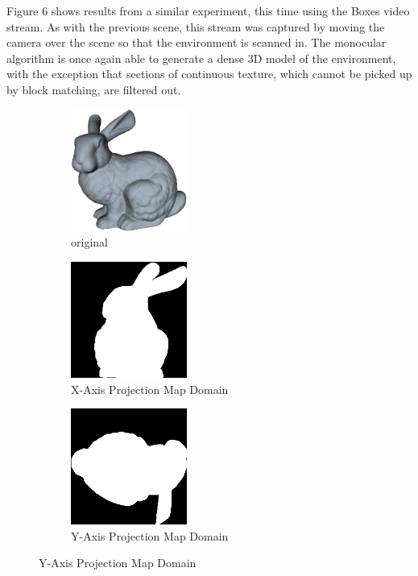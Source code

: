 Figure 6 shows results from a similar experiment, this
time using the Boxes video stream. As with the previous
scene, this stream was captured by moving the camera over the scene so that the environment is scanned in. The
monocular algorithm is once again able to generate a dense
3D model of the environment, with the exception that
sections of continuous texture, which cannot be picked up by
block matching, are filtered out.



\begin{figure}[!htb]
        \centering
        \begin{subfigure}[b]{1.5in}
                \includegraphics[width=1.5in]{images/ch2/bunny}
                \caption{original}
                \label{fig:bunnyOrigAA2}
        \end{subfigure}%
        \begin{subfigure}[b]{1.5in}
                \includegraphics[width=1.5in]{images/methodology/FVR/xaxis}
                \caption{X-Axis Projection Map Domain}
                \label{fig:xaxPMDOM}
        \end{subfigure}
        \begin{subfigure}[b]{1.5in}
                \includegraphics[width=1.5in]{images/methodology/FVR/yaxis}
                \caption{Y-Axis Projection Map Domain}

\end{subfigure}
\end{figure}
